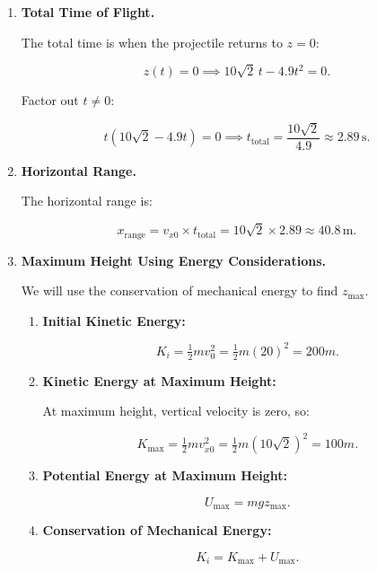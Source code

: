 \begin{example}
\begin{solution}
\begin{enumerate}
    So, the maximum height is approximately \( 10.2 \, \text{m} \).
    
    \item \textbf{Total Time of Flight.}
    
    The total time is when the projectile returns to \( z = 0 \):
    
    \[
    z(t) = 0 \implies 10\sqrt{2} \, t - 4.9 t^2 = 0.
    \]
    
    Factor out \( t \neq 0 \):
    
    \[
    t \left( 10\sqrt{2} - 4.9 t \right) = 0 \implies t_{\text{total}} = \dfrac{10\sqrt{2}}{4.9} \approx 2.89 \, \text{s}.
    \]
    
    \item \textbf{Horizontal Range.}
    
    The horizontal range is:
    
    \[
    x_{\text{range}} = v_{x0} \times t_{\text{total}} = 10\sqrt{2} \times 2.89 \approx 40.8 \, \text{m}.
    \]
    
    \item \textbf{Maximum Height Using Energy Considerations.}
    
    We will use the conservation of mechanical energy to find \( z_{\text{max}} \).
    
    \begin{enumerate}
        \item \textbf{Initial Kinetic Energy:}
        
        \[
        K_i = \tfrac{1}{2} m v_0^2 = \tfrac{1}{2} m (20)^2 = 200 m.
        \]
        
        \item \textbf{Kinetic Energy at Maximum Height:}
        
        At maximum height, vertical velocity is zero, so:
        
        \[
        K_{\text{max}} = \tfrac{1}{2} m v_{x0}^2 = \tfrac{1}{2} m (10\sqrt{2})^2 = 100 m.
        \]
        
        \item \textbf{Potential Energy at Maximum Height:}
        
        \[
        U_{\text{max}} = m g z_{\text{max}}.
        \]
        
        \item \textbf{Conservation of Mechanical Energy:}
        
        \[
        K_i = K_{\text{max}} + U_{\text{max}}.
        \]
        

\end{enumerate}
\end{enumerate}
\end{solution}
\end{example}

